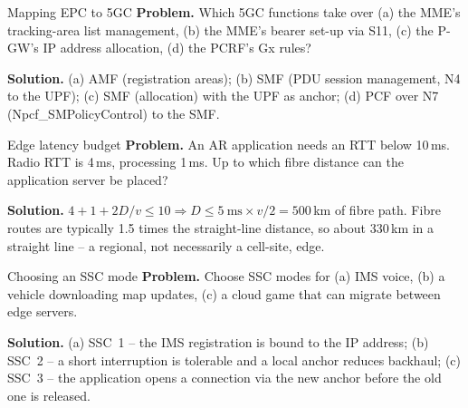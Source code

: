 \documentclass[11pt,a4paper]{article}
\begin{document}
\begin{examplebox}{Mapping EPC to 5GC}\label{ex:map}
\textbf{Problem.} Which 5GC functions take over (a) the MME's tracking-area list management, (b) the MME's bearer set-up via S11,
(c) the P-GW's IP address allocation, (d) the PCRF's Gx rules?

\textbf{Solution.} (a) AMF (registration areas); (b) SMF (PDU session management, N4 to the UPF); (c) SMF (allocation) with the
UPF as anchor; (d) PCF over N7 (Npcf\_SMPolicyControl) to the SMF.
\end{examplebox}

\begin{examplebox}{Edge latency budget}\label{ex:edge}
\textbf{Problem.} An AR application needs an RTT below 10\,ms. Radio RTT is 4\,ms, processing 1\,ms. Up to which fibre distance can the
application server be placed?

\textbf{Solution.} $4 + 1 + 2D/v \le 10 \Rightarrow D \le 5\ \text{ms}\times v/2 = 500$\,km of fibre path. Fibre routes are typically 1.5 times
the straight-line distance, so about 330\,km in a straight line -- a regional, not necessarily a cell-site, edge.
\end{examplebox}

\begin{examplebox}{Choosing an SSC mode}\label{ex:ssc}
\textbf{Problem.} Choose SSC modes for (a) IMS voice, (b) a vehicle downloading map updates, (c) a cloud game that can migrate between edge
servers.

\textbf{Solution.} (a) SSC~1 -- the IMS registration is bound to the IP address; (b) SSC~2 -- a short interruption is tolerable and a local
anchor reduces backhaul; (c) SSC~3 -- the application opens a connection via the new anchor before the old one is released.
\end{examplebox}

\end{document}

